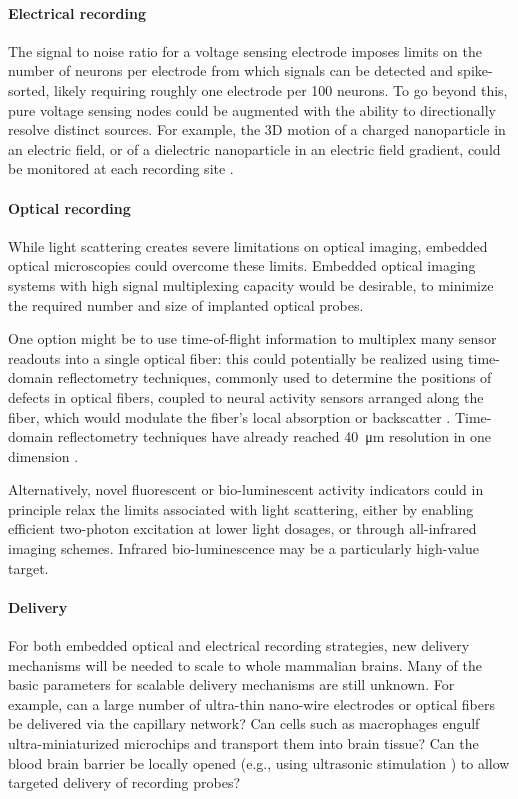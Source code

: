 \paragraph{Electrical recording} The signal to noise ratio for a voltage sensing electrode imposes limits on the number of neurons per electrode from which signals can be detected and spike-sorted, likely requiring roughly one electrode per \num{100} neurons. To go beyond this, pure voltage sensing nodes could be augmented with the ability to directionally resolve distinct sources. For example, the 3D motion of a charged nanoparticle in an electric field, or of a dielectric nanoparticle in an electric field gradient, could be monitored at each recording site \cite{WoodPersonalCommunication}.

\paragraph{Optical recording} While light scattering creates severe limitations on optical imaging, embedded optical microscopies could overcome these limits. Embedded optical imaging systems with high signal multiplexing capacity would be desirable, to minimize the required number and size of implanted optical probes. 

One option might be to use time-of-flight information to multiplex many sensor readouts into a single optical fiber: this could potentially be realized using time-domain reflectometry techniques, commonly used to determine the positions of defects in optical fibers, coupled to neural activity sensors arranged along the fiber, which would modulate the fiber's local absorption or backscatter \cite{WoodPersonalCommunication}. Time-domain reflectometry techniques have already reached \SI{40}{\micro\meter} resolution in one dimension \cite{Lamy1981fi}.

Alternatively, novel fluorescent or bio-luminescent activity indicators could in principle relax the limits associated with light scattering, either by enabling efficient two-photon excitation at lower light dosages, or through all-infrared imaging schemes. Infrared bio-luminescence may be a particularly high-value target.

\paragraph{Delivery} For both embedded optical and electrical recording strategies, new delivery mechanisms will be needed to scale to whole mammalian brains. Many of the basic parameters for scalable delivery mechanisms are still unknown. For example, can a large number of ultra-thin nano-wire electrodes or optical fibers be delivered via the capillary network? Can cells such as macrophages engulf ultra-miniaturized microchips and transport them into brain tissue? Can the blood brain barrier be locally opened (e.g., using ultrasonic stimulation \cite{hynynen2005local}) to allow targeted delivery of recording probes?

